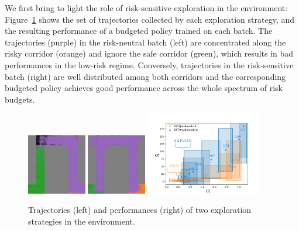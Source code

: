 \documentclass{article}
\begin{document}
We first bring to light the role of risk-sensitive exploration in the  environment: Figure~\ref{fig:exploration} shows the set of trajectories collected by each exploration strategy, and the resulting performance of a budgeted policy trained on each batch. The trajectories (purple) in the risk-neutral batch (left) are concentrated along the risky corridor (orange) and ignore the safe corridor (green), which results in bad performances in the low-risk regime. Conversely, trajectories in the risk-sensitive batch (right) are well distributed among both corridors and the corresponding budgeted policy achieves good performance across the whole spectrum of risk budgets.
\begin{figure}[tp]
    \centering
    \includegraphics[width=0.23\textwidth]{source/img/risk-neutral.png}
    \includegraphics[width=0.23\textwidth]{source/img/risk-sensitive.png}
    \includegraphics[page=1, width=0.45\textwidth]{source/img/corridors}
    \caption{Trajectories (left) and performances (right) of two exploration strategies in the  environment. }
    \label{fig:exploration}
\end{figure}
\end{document}
